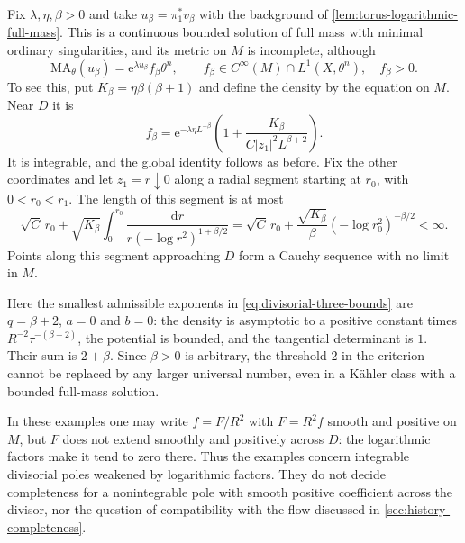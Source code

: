 \begin{example}\label{ex:supercritical-incomplete-divisor}
Fix $\lambda,\eta,\beta>0$ and take $u_\beta=\pi_1^*v_\beta$ with the background of \cref{lem:torus-logarithmic-full-mass}. This is a continuous bounded solution of full mass with minimal ordinary singularities, and its metric on $M$ is incomplete, although
\[
 \mathrm{MA}_\theta(u_\beta)=\mathrm{e}^{\lambda u_\beta}f_\beta\theta^n,
 \qquad f_\beta\in C^\infty(M)\cap L^1(X,\theta^n),\quad f_\beta>0.
\]
To see this, put $K_\beta=\eta\beta(\beta+1)$ and define the density by the equation on $M$. Near $D$ it is
\[
 f_\beta=\mathrm{e}^{-\lambda\eta L^{-\beta}}
       \left(1+\frac{K_\beta}{C|z_1|^2L^{\beta+2}}\right).
\]
It is integrable, and the global identity follows as before. Fix the other coordinates and let $z_1=r\downarrow0$ along a radial segment starting at $r_0$, with $0<r_0<r_1$. The length of this segment is at most
\[
 \sqrt C\,r_0+\sqrt{K_\beta}
   \int_0^{r_0}\frac{\mathrm{d}r}{r(-\log r^2)^{1+\beta/2}}
 =\sqrt C\,r_0+\frac{\sqrt{K_\beta}}{\beta}
       (-\log r_0^2)^{-\beta/2}<\infty.
\]
Points along this segment approaching $D$ form a Cauchy sequence with no limit in $M$.

Here the smallest admissible exponents in \eqref{eq:divisorial-three-bounds} are $q=\beta+2$, $a=0$ and $b=0$: the density is asymptotic to a positive constant times $R^{-2}\tau^{-(\beta+2)}$, the potential is bounded, and the tangential determinant is $1$. Their sum is $2+\beta$. Since $\beta>0$ is arbitrary, the threshold $2$ in the criterion cannot be replaced by any larger universal number, even in a K\"ahler class with a bounded full-mass solution.
\end{example}

In these examples one may write $f=F/R^2$ with $F=R^2f$ smooth and positive on $M$, but $F$ does not extend smoothly and positively across $D$: the logarithmic factors make it tend to zero there. Thus the examples concern integrable divisorial poles weakened by logarithmic factors. They do not decide completeness for a nonintegrable pole with smooth positive coefficient across the divisor, nor the question of compatibility with the flow discussed in \cref{sec:history-completeness}.
